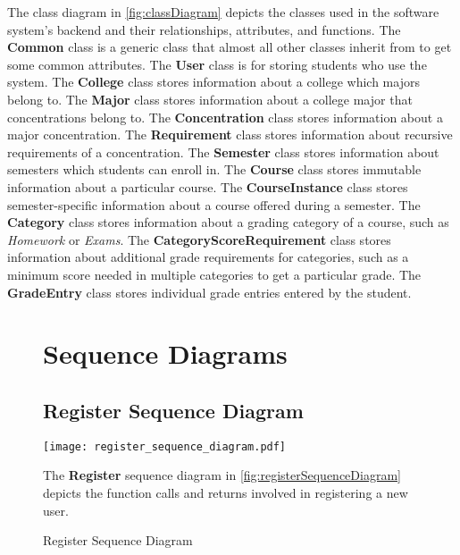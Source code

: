\documentclass[12pt]{article}
\begin{document}
\clearpage

The class diagram in \autoref{fig:classDiagram} depicts the classes used in the software system's
backend and their relationships, attributes, and functions. The \textbf{Common} class is a generic
class that almost all other classes inherit from to get some common attributes. The \textbf{User}
class is for storing students who use the system. The \textbf{College} class stores information
about a college which majors belong to. The \textbf{Major} class stores information about a college
major that concentrations belong to. The \textbf{Concentration} class stores information about a
major concentration. The \textbf{Requirement} class stores information about recursive requirements
of a concentration. The \textbf{Semester} class stores information about semesters which students
can enroll in. The  \textbf{Course} class stores immutable information about a particular course.
The \textbf{CourseInstance} class stores semester-specific information about a course offered during
a semester. The \textbf{Category} class stores information about a grading category of a course,
such as \emph{Homework} or \emph{Exams}. The \textbf{CategoryScoreRequirement} class stores
information about additional grade requirements for categories, such as a minimum score needed in
multiple categories to get a particular grade. The \textbf{GradeEntry} class stores individual grade
entries entered by the student.

\clearpage

\newcommand{\seqdiades}[3]{
    \begin{justify}
      The \textbf{#1} sequence diagram in \autoref{#2} depicts the function calls and returns
      involved in #3.
    \end{justify}
}

\begin{figure}[p!]
  \section{Sequence Diagrams}
  \subsection{Register Sequence Diagram}
  \centering
  \texttt{[image: register\_sequence\_diagram.pdf]}
  \caption{Register Sequence Diagram}
  \label{fig:registerSequenceDiagram}
  \seqdiades{Register}{fig:registerSequenceDiagram}{registering a new user}
\end{figure}
\end{document}
